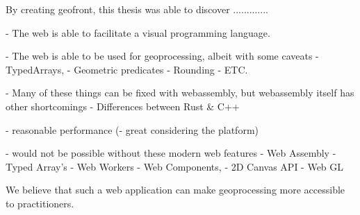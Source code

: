 
By creating geofront, this thesis was able to discover .............

- The web is able to facilitate a visual programming language.

- The web is able to be used for geoprocessing, albeit with some caveats
  - TypedArrays,
  - Geometric predicates 
  - Rounding
  - ETC.

- Many of these things can be fixed with webassembly, but webassembly itself has other shortcomings
  - Differences between Rust \& C++

- reasonable performance 
  (- great considering the platform)

- would not be possible without these modern web features
  - Web Assembly 
  - Typed Array's 
  - Web Workers
  - Web Components,
  - 2D Canvas API
  - Web GL


We believe that such a web application can make geoprocessing more accessible to practitioners.














